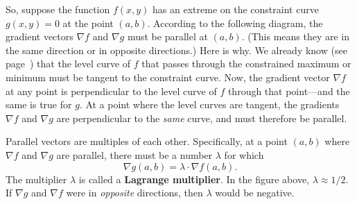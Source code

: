 {{{{        So, suppose the function $f(x, y)$ has an extreme on the constraint curve $g(x, y) = 0$ at the point $(a, b)$.  According to the following diagram, the gradient vectors $\nabla f$\index{$\nabla$} and $\nabla g$ must be parallel at $(a, b)$.  
(This means they are in the same direction or in opposite directions.)  Here is why.  We already know (see page~\pageref{constraint}) that the level curve of $f$ that passes through the constrained maximum or minimum must be tangent to the constraint curve.   Now, the gradient vector $\nabla f$ at any point is perpendicular to the level curve of $f$ through that point---and the same is true for $g$.  At a point where the level curves are tangent, the gradients $\nabla f$ and $\nabla g$ are perpendicular to the {\em same\/} curve, and must therefore be parallel.
        
        
        
\vspace{190pt}

        Parallel vectors are multiples of each other.  
Specifically, at a point $(a, b)$ where $\nabla f$ and $\nabla g$ are parallel, there must be a number $\lambda$\index{$\lambda$} for which
        \[
\nabla g (a, b) = \lambda \cdot \nabla f (a, b).
\]
The multiplier $\lambda$ is called a {\bf Lagrange multiplier}.   In the figure above, $\lambda \approx 1/2$.  If $\nabla g$ and $\nabla f$ were in {\em opposite\/} directions, then $\lambda$ would be negative.


}}}}
